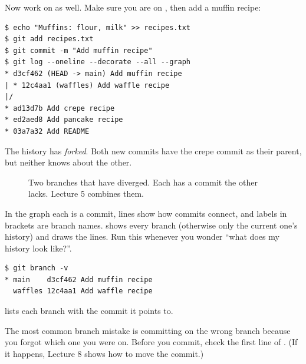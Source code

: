 Now work on  as well. Make sure you are on , then add a muffin recipe:

\begin{lstlisting}
$ echo "Muffins: flour, milk" >> recipes.txt
$ git add recipes.txt
$ git commit -m "Add muffin recipe"
$ git log --oneline --decorate --all --graph
* d3cf462 (HEAD -> main) Add muffin recipe
| * 12c4aa1 (waffles) Add waffle recipe
|/
* ad13d7b Add crepe recipe
* ed2aed8 Add pancake recipe
* 03a7a32 Add README
\end{lstlisting}

The history has \emph{forked}. Both new commits have the crepe commit as their parent, but neither knows about the other.

\begin{figure}[H]
\centering
{}
\caption{Two branches that have diverged. Each has a commit the other lacks. Lecture 5 combines them.}
\label{fig:diverge}
\end{figure}

In the graph each \code{*} is a commit, lines show how commits connect, and labels in brackets are branch names.  shows every branch (otherwise only the current one's history) and  draws the lines. Run this whenever you wonder ``what does my history look like?''.

\begin{lstlisting}
$ git branch -v
* main    d3cf462 Add muffin recipe
  waffles 12c4aa1 Add waffle recipe
\end{lstlisting}

 lists each branch with the commit it points to.

\begin{pitfall}
The most common branch mistake is committing on the wrong branch because you forgot which one you were on. Before you commit, check the first line of . (If it happens, Lecture 8 shows how to move the commit.)
\end{pitfall}

